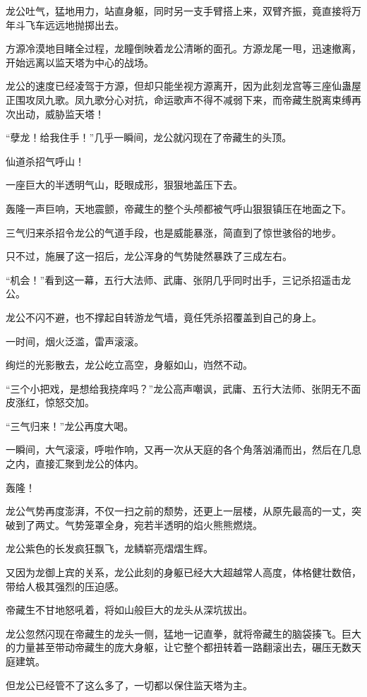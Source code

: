 \begin{this_body}
龙公吐气，猛地用力，站直身躯，同时另一支手臂搭上来，双臂齐振，竟直接将万年斗飞车远远地抛掷出去。

方源冷漠地目睹全过程，龙瞳倒映着龙公清晰的面孔。方源龙尾一甩，迅速撤离，开始远离以监天塔为中心的战场。

龙公的速度已经凌驾于方源，但却只能坐视方源离开，因为此刻龙宫等三座仙蛊屋正围攻凤九歌。凤九歌分心对抗，命运歌声不得不减弱下来，而帝藏生脱离束缚再次出动，威胁监天塔！

“孽龙！给我住手！”几乎一瞬间，龙公就闪现在了帝藏生的头顶。

仙道杀招气呼山！

一座巨大的半透明气山，眨眼成形，狠狠地盖压下去。

轰隆一声巨响，天地震颤，帝藏生的整个头颅都被气呼山狠狠镇压在地面之下。

三气归来杀招令龙公的气道手段，也是威能暴涨，简直到了惊世骇俗的地步。

只不过，施展了这一招后，龙公浑身的气势陡然暴跌了三成左右。

“机会！”看到这一幕，五行大法师、武庸、张阴几乎同时出手，三记杀招遥击龙公。

龙公不闪不避，也不撑起自转游龙气墙，竟任凭杀招覆盖到自己的身上。

一时间，烟火泛滥，雷声滚滚。

绚烂的光影散去，龙公屹立高空，身躯如山，岿然不动。

“三个小把戏，是想给我挠痒吗？”龙公高声嘲讽，武庸、五行大法师、张阴无不面皮涨红，惊怒交加。

“三气归来！”龙公再度大喝。

一瞬间，大气滚滚，呼啦作响，又再一次从天庭的各个角落汹涌而出，然后在几息之内，直接汇聚到龙公的体内。

轰隆！

龙公气势再度澎湃，不仅一扫之前的颓势，还更上一层楼，从原先最高的一丈，突破到了两丈。气势笼罩全身，宛若半透明的焰火熊熊燃烧。

龙公紫色的长发疯狂飘飞，龙鳞崭亮熠熠生辉。

又因为龙御上宾的关系，龙公此刻的身躯已经大大超越常人高度，体格健壮数倍，带给人极其强烈的压迫感。

帝藏生不甘地怒吼着，将如山般巨大的龙头从深坑拔出。

龙公忽然闪现在帝藏生的龙头一侧，猛地一记直拳，就将帝藏生的脑袋揍飞。巨大的力量甚至带动帝藏生的庞大身躯，让它整个都扭转着一路翻滚出去，碾压无数天庭建筑。

但龙公已经管不了这么多了，一切都以保住监天塔为主。


\end{this_body}
